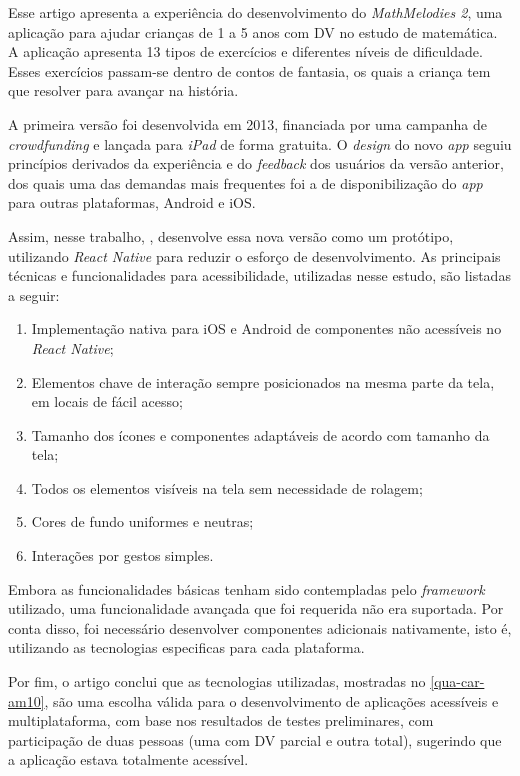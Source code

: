 Esse artigo apresenta a experiência do desenvolvimento do \emph{MathMelodies 2}, uma aplicação para ajudar crianças de 1 a 5 anos com DV no estudo de matemática.
A aplicação apresenta 13 tipos de exercícios e diferentes níveis de dificuldade.
Esses exercícios passam-se dentro de contos de fantasia, os quais a criança tem que resolver para avançar na história.

A primeira versão foi desenvolvida em 2013, financiada por uma campanha de \emph{crowdfunding} e lançada para \emph{iPad} de forma gratuita.
O \emph{design} do novo \emph{app} seguiu princípios derivados da experiência e do \emph{feedback} dos usuários da versão anterior, dos quais
uma das demandas mais frequentes foi a de disponibilização do \emph{app} para outras plataformas, Android e iOS\@.

Assim, nesse trabalho, , desenvolve essa nova versão como um protótipo, utilizando \emph{React Native} para reduzir o esforço de desenvolvimento.
As principais técnicas e funcionalidades para acessibilidade, utilizadas nesse estudo, são listadas a seguir:

\begin{enumerate}
  \item Implementação nativa para iOS e Android de componentes não acessíveis no \emph{React Native};
  \item Elementos chave de interação sempre posicionados na mesma parte da tela, em locais de fácil acesso;
  \item Tamanho dos ícones e componentes adaptáveis de acordo com tamanho da tela;
  \item Todos os elementos visíveis na tela sem necessidade de rolagem;
  \item Cores de fundo uniformes e neutras;
  \item Interações por gestos simples.
\end{enumerate}

Embora as funcionalidades básicas tenham sido contempladas pelo \emph{framework} utilizado, uma funcionalidade avançada que foi requerida não era suportada.
Por conta disso, foi necessário desenvolver componentes adicionais nativamente, isto é, utilizando as tecnologias especificas para cada plataforma.

Por fim, o artigo conclui que as tecnologias utilizadas, mostradas no \autoref{qua-car-am10}, são uma escolha válida para o desenvolvimento
de aplicações acessíveis e multiplataforma, com base nos resultados de testes preliminares, com participação de duas pessoas (uma com DV
parcial e outra total), sugerindo que a aplicação estava totalmente acessível.

